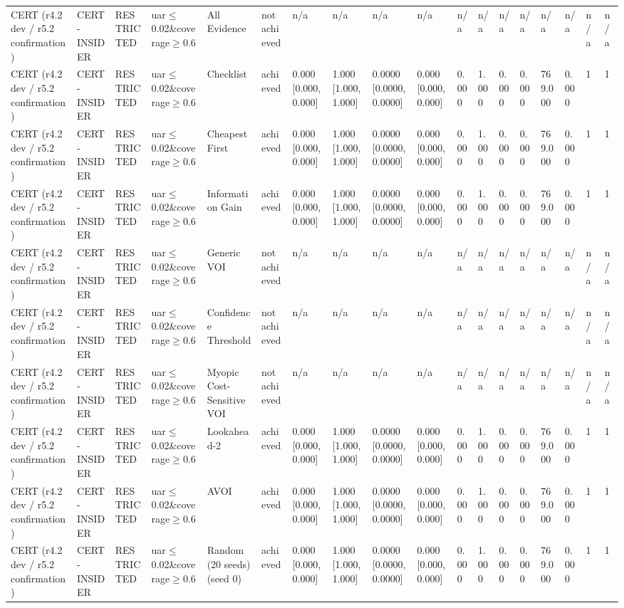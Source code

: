\begin{table}[!ht]
{\begin{tabular}{llllllllllllllllll}
CERT (r4.2 dev / r5.2 confirmation) & CERT-INSIDER & RESTRICTED & uar$\le$0.02\&coverage$\ge$0.6 & All Evidence & not achieved & n/a & n/a & n/a & n/a & n/a & n/a & n/a & n/a & n/a & n/a & n/a & n/a \\
CERT (r4.2 dev / r5.2 confirmation) & CERT-INSIDER & RESTRICTED & uar$\le$0.02\&coverage$\ge$0.6 & Checklist & achieved & 0.000 [0.000, 0.000] & 1.000 [1.000, 1.000] & 0.0000 [0.0000, 0.0000] & 0.000 [0.000, 0.000] & 0.000 & 1.000 & 0.000 & 0.000 & 769.000 & 0.000 & 1 & 1 \\
CERT (r4.2 dev / r5.2 confirmation) & CERT-INSIDER & RESTRICTED & uar$\le$0.02\&coverage$\ge$0.6 & Cheapest First & achieved & 0.000 [0.000, 0.000] & 1.000 [1.000, 1.000] & 0.0000 [0.0000, 0.0000] & 0.000 [0.000, 0.000] & 0.000 & 1.000 & 0.000 & 0.000 & 769.000 & 0.000 & 1 & 1 \\
CERT (r4.2 dev / r5.2 confirmation) & CERT-INSIDER & RESTRICTED & uar$\le$0.02\&coverage$\ge$0.6 & Information Gain & achieved & 0.000 [0.000, 0.000] & 1.000 [1.000, 1.000] & 0.0000 [0.0000, 0.0000] & 0.000 [0.000, 0.000] & 0.000 & 1.000 & 0.000 & 0.000 & 769.000 & 0.000 & 1 & 1 \\
CERT (r4.2 dev / r5.2 confirmation) & CERT-INSIDER & RESTRICTED & uar$\le$0.02\&coverage$\ge$0.6 & Generic VOI & not achieved & n/a & n/a & n/a & n/a & n/a & n/a & n/a & n/a & n/a & n/a & n/a & n/a \\
CERT (r4.2 dev / r5.2 confirmation) & CERT-INSIDER & RESTRICTED & uar$\le$0.02\&coverage$\ge$0.6 & Confidence Threshold & not achieved & n/a & n/a & n/a & n/a & n/a & n/a & n/a & n/a & n/a & n/a & n/a & n/a \\
CERT (r4.2 dev / r5.2 confirmation) & CERT-INSIDER & RESTRICTED & uar$\le$0.02\&coverage$\ge$0.6 & Myopic Cost-Sensitive VOI & not achieved & n/a & n/a & n/a & n/a & n/a & n/a & n/a & n/a & n/a & n/a & n/a & n/a \\
CERT (r4.2 dev / r5.2 confirmation) & CERT-INSIDER & RESTRICTED & uar$\le$0.02\&coverage$\ge$0.6 & Lookahead-2 & achieved & 0.000 [0.000, 0.000] & 1.000 [1.000, 1.000] & 0.0000 [0.0000, 0.0000] & 0.000 [0.000, 0.000] & 0.000 & 1.000 & 0.000 & 0.000 & 769.000 & 0.000 & 1 & 1 \\
CERT (r4.2 dev / r5.2 confirmation) & CERT-INSIDER & RESTRICTED & uar$\le$0.02\&coverage$\ge$0.6 & AVOI & achieved & 0.000 [0.000, 0.000] & 1.000 [1.000, 1.000] & 0.0000 [0.0000, 0.0000] & 0.000 [0.000, 0.000] & 0.000 & 1.000 & 0.000 & 0.000 & 769.000 & 0.000 & 1 & 1 \\
CERT (r4.2 dev / r5.2 confirmation) & CERT-INSIDER & RESTRICTED & uar$\le$0.02\&coverage$\ge$0.6 & Random (20 seeds) (seed 0) & achieved & 0.000 [0.000, 0.000] & 1.000 [1.000, 1.000] & 0.0000 [0.0000, 0.0000] & 0.000 [0.000, 0.000] & 0.000 & 1.000 & 0.000 & 0.000 & 769.000 & 0.000 & 1 & 1 \\

\end{tabular}}
\end{table}
